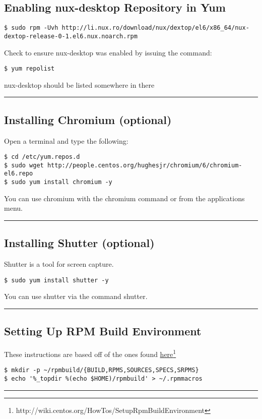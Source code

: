 \subsection{Enabling nux-desktop Repository in Yum}
\begin{snugshade}\begin{verbatim}
$ sudo rpm -Uvh http://li.nux.ro/download/nux/dextop/el6/x86_64/nux-dextop-release-0-1.el6.nux.noarch.rpm 
\end{verbatim}\end{snugshade}\noindent
Check to ensure nux-desktop was enabled by issuing the command:
\begin{snugshade}\begin{verbatim}
$ yum repolist
\end{verbatim}\end{snugshade}\noindent
nux-desktop should be listed somewhere in there
\hrule

\subsection{Installing Chromium (optional)}
Open a terminal and type the following:
\begin{snugshade}\begin{verbatim}
$ cd /etc/yum.repos.d
$ sudo wget http://people.centos.org/hughesjr/chromium/6/chromium-el6.repo
$ sudo yum install chromium -y
\end{verbatim}\end{snugshade}\noindent
You can use chromium with the chromium command or from the applications menu.\\
\hrule

\subsection{Installing Shutter (optional)}
Shutter is a tool for screen capture.
\begin{snugshade}\begin{verbatim}
$ sudo yum install shutter -y
\end{verbatim}\end{snugshade}\noindent
You can use shutter via the command shutter.\\
\hrule

\subsection{Setting Up RPM Build Environment}
These instructions are based off of the ones found \href{http://wiki.centos.org/HowTos/SetupRpmBuildEnvironment}{here}\footnote{http://wiki.centos.org/HowTos/SetupRpmBuildEnvironment}
\begin{snugshade}\begin{verbatim}
$ mkdir -p ~/rpmbuild/{BUILD,RPMS,SOURCES,SPECS,SRPMS}
$ echo '%_topdir %(echo $HOME)/rpmbuild' > ~/.rpmmacros
\end{verbatim}\end{snugshade}\noindent

\hrule

\newpage